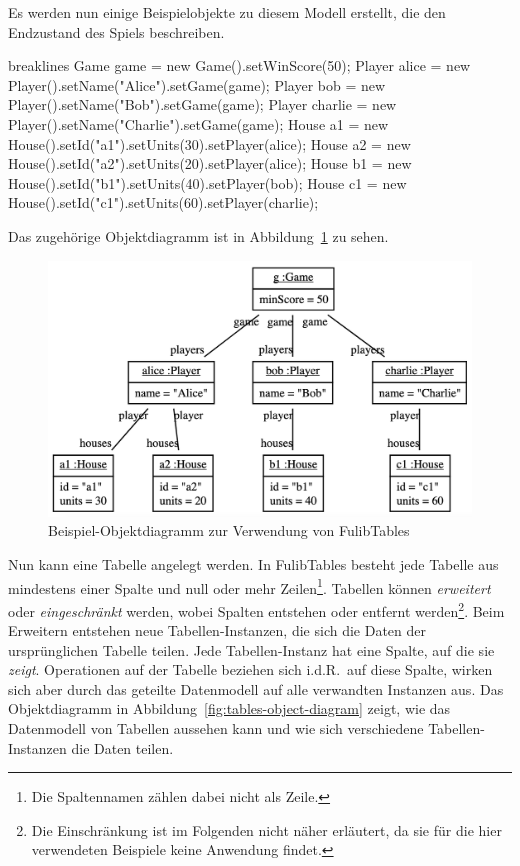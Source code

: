 Es werden nun einige Beispielobjekte zu diesem Modell erstellt, die den Endzustand des Spiels beschreiben.

\begin{jcodeblock*}{breaklines}
    Game game = new Game().setWinScore(50);
    Player alice = new Player().setName("Alice").setGame(game);
    Player bob = new Player().setName("Bob").setGame(game);
    Player charlie = new Player().setName("Charlie").setGame(game);
    House a1 = new House().setId("a1").setUnits(30).setPlayer(alice);
    House a2 = new House().setId("a2").setUnits(20).setPlayer(alice);
    House b1 = new House().setId("b1").setUnits(40).setPlayer(bob);
    House c1 = new House().setId("c1").setUnits(60).setPlayer(charlie);
\end{jcodeblock*}

Das zugehörige Objektdiagramm ist in Abbildung~\ref{fig:game-object-diagram} zu sehen.

\begin{figure}
    \includegraphics[width=\textwidth]{chapter/pattern-matching/img/game-object-diagram.png}
    \caption{Beispiel-Objektdiagramm zur Verwendung von FulibTables}
    \label{fig:game-object-diagram}
\end{figure}

Nun kann eine Tabelle angelegt werden.
In FulibTables besteht jede Tabelle aus mindestens einer Spalte und null oder mehr Zeilen\footnote{Die Spaltennamen zählen dabei nicht als Zeile.}.
Tabellen können \emph{erweitert} oder \emph{eingeschränkt} werden, wobei Spalten entstehen oder entfernt werden\footnote{Die Einschränkung ist im Folgenden nicht näher erläutert, da sie für die hier verwendeten Beispiele keine Anwendung findet.}.
Beim Erweitern entstehen neue Tabellen-Instanzen,
die sich die Daten der ursprünglichen Tabelle teilen.
Jede Tabellen-Instanz hat eine Spalte, auf die sie \emph{zeigt}.
Operationen auf der Tabelle beziehen sich i.d.R.\ auf diese Spalte,
wirken sich aber durch das geteilte Datenmodell auf alle verwandten Instanzen aus.
Das Objektdiagramm in Abbildung~\ref{fig:tables-object-diagram} zeigt, wie das Datenmodell von Tabellen aussehen kann und wie sich verschiedene Tabellen-Instanzen die Daten teilen.

